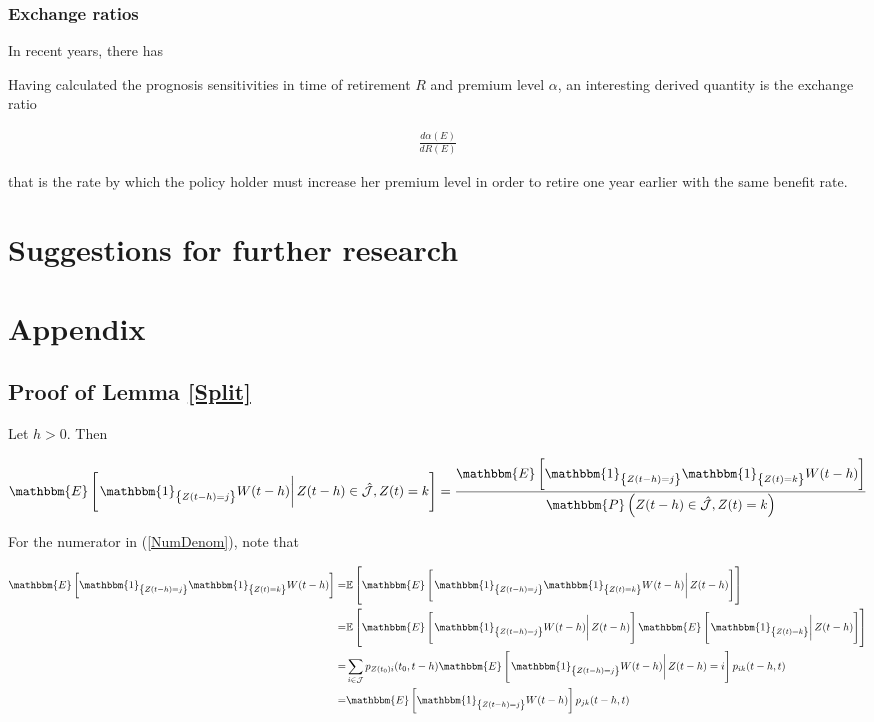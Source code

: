 \documentclass{book}
\newcommand{\1}[1]{\mathbbm{1}_{\left\lbrace #1 \right\rbrace}}
\newcommand{\expec}[1][def]{\mathbbm{E} \left[ #1 \right]}
\newcommand{\econd}[2][def]{\mathbbm{E} \left[ \left. #1 \right| #2 \right]}
\newcommand{\probability}[1][def]{\mathbbm{P} \left( #1 \right)}
\theoremstyle{break}
\theoremstyle{remark}
\numberwithin{equation}{section}
\begin{document}
\subsection{Exchange ratios}

In recent years, there has

Having calculated the prognosis sensitivities in time of retirement $R$ and premium level $\alpha$, an interesting derived quantity is the exchange ratio

\begin{align*}
	\frac{d \alpha (E)}{d R (E)}
\end{align*}

that is the rate by which the policy holder must increase her premium level in order to retire one year earlier with the same benefit rate. 

\chapter{Suggestions for further research}

\chapter{Appendix}

\section{Proof of Lemma \ref{Split}}

Let $h>0$. Then

\begin{align} \label{NumDenom}
	\econd[\1{Z(t-h)=j} W(t-h)]{Z(t-h) \in \hat{\mathcal{J}}, Z(t) = k} = \frac{\expec[\1{Z(t-h)=j} \1{Z(t)=k} W(t-h)]}{\probability[Z(t-h) \in \hat{\mathcal{J}}, Z(t)=k]}
\end{align}

For the numerator in (\ref{NumDenom}), note that 

\begin{align*}
	\expec[\1{Z(t-h)=j} \1{Z(t)=k} W(t-h)] =& \mathbb{E} \left[ \econd[\1{Z(t-h)=j} \1{Z(t)=k} W(t-h)]{Z(t-h)} \right] \\
	=& \mathbb{E} \left[ \econd[\1{Z(t-h)=j} W(t-h)]{Z(t-h)} \econd[\1{Z(t)=k}]{Z(t-h)} \right] \\
	=& \sum_{i \in \mathcal{J}} p_{Z(t_0)i}(t_0,t-h) \econd[\1{Z(t-h)=j} W(t-h)]{Z(t-h)=i} p_{ik}(t-h,t) \\
	=& \expec[\1{Z(t-h)=j} W(t-h)] p_{jk}(t-h,t)
\end{align*}
\end{document}
